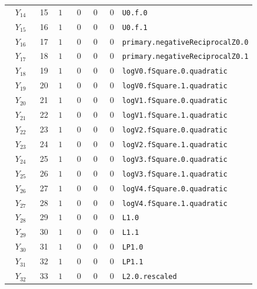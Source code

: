 {\begin{longtable}{@{}r r c r r r p{0.49\linewidth}@{}}
\(Y_{14}\) & 15 & \(1\) & 0 & 0 & 0 & \texttt{U0.\allowbreak{}f.\allowbreak{}0} \\
\(Y_{15}\) & 16 & \(1\) & 0 & 0 & 0 & \texttt{U0.\allowbreak{}f.\allowbreak{}1} \\
\(Y_{16}\) & 17 & \(1\) & 0 & 0 & 0 & \texttt{primary.\allowbreak{}negativeReciprocalZ0.\allowbreak{}0} \\
\(Y_{17}\) & 18 & \(1\) & 0 & 0 & 0 & \texttt{primary.\allowbreak{}negativeReciprocalZ0.\allowbreak{}1} \\
\(Y_{18}\) & 19 & \(1\) & 0 & 0 & 0 & \texttt{logV0.\allowbreak{}fSquare.\allowbreak{}0.\allowbreak{}quadratic} \\
\(Y_{19}\) & 20 & \(1\) & 0 & 0 & 0 & \texttt{logV0.\allowbreak{}fSquare.\allowbreak{}1.\allowbreak{}quadratic} \\
\(Y_{20}\) & 21 & \(1\) & 0 & 0 & 0 & \texttt{logV1.\allowbreak{}fSquare.\allowbreak{}0.\allowbreak{}quadratic} \\
\(Y_{21}\) & 22 & \(1\) & 0 & 0 & 0 & \texttt{logV1.\allowbreak{}fSquare.\allowbreak{}1.\allowbreak{}quadratic} \\
\(Y_{22}\) & 23 & \(1\) & 0 & 0 & 0 & \texttt{logV2.\allowbreak{}fSquare.\allowbreak{}0.\allowbreak{}quadratic} \\
\(Y_{23}\) & 24 & \(1\) & 0 & 0 & 0 & \texttt{logV2.\allowbreak{}fSquare.\allowbreak{}1.\allowbreak{}quadratic} \\
\(Y_{24}\) & 25 & \(1\) & 0 & 0 & 0 & \texttt{logV3.\allowbreak{}fSquare.\allowbreak{}0.\allowbreak{}quadratic} \\
\(Y_{25}\) & 26 & \(1\) & 0 & 0 & 0 & \texttt{logV3.\allowbreak{}fSquare.\allowbreak{}1.\allowbreak{}quadratic} \\
\(Y_{26}\) & 27 & \(1\) & 0 & 0 & 0 & \texttt{logV4.\allowbreak{}fSquare.\allowbreak{}0.\allowbreak{}quadratic} \\
\(Y_{27}\) & 28 & \(1\) & 0 & 0 & 0 & \texttt{logV4.\allowbreak{}fSquare.\allowbreak{}1.\allowbreak{}quadratic} \\
\(Y_{28}\) & 29 & \(1\) & 0 & 0 & 0 & \texttt{L1.\allowbreak{}0} \\
\(Y_{29}\) & 30 & \(1\) & 0 & 0 & 0 & \texttt{L1.\allowbreak{}1} \\
\(Y_{30}\) & 31 & \(1\) & 0 & 0 & 0 & \texttt{LP1.\allowbreak{}0} \\
\(Y_{31}\) & 32 & \(1\) & 0 & 0 & 0 & \texttt{LP1.\allowbreak{}1} \\
\(Y_{32}\) & 33 & \(1\) & 0 & 0 & 0 & \texttt{L2.\allowbreak{}0.\allowbreak{}rescaled} \\

\end{longtable}}
